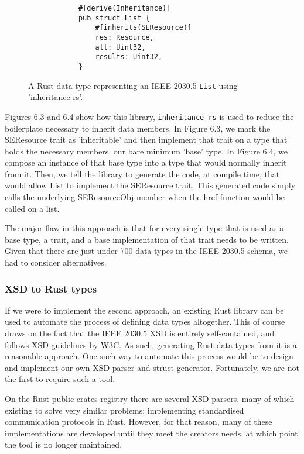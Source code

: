 \begin{figure}[H]
    \begin{center}
        \begin{lstlisting}
            #[derive(Inheritance)]
            pub struct List {
                #[inherits(SEResource)]
                res: Resource,
                all: Uint32,
                results: Uint32,
            }
        \end{lstlisting}
        \label{fig:listinher}
        \caption{A Rust data type representing an IEEE 2030.5 \texttt{List} using 'inheritance-rs'.}
    \end{center}
\end{figure}


Figures 6.3 and 6.4 show how this library, \texttt{inheritance-rs} \cite[]{inheritancers} is used to reduce the boilerplate necessary to inherit data members. 
In Figure 6.3, we mark the SEResource trait as 'inheritable' and then implement that trait on a type that holds the necessary members, our bare minimum 'base' type. 
In Figure 6.4, we compose an instance of that base type into a type that would normally inherit from it. Then, we tell the library to generate the code, at compile time, that would allow List to implement the SEResource trait.
This generated code simply calls the underlying SEResourceObj member when the href function would be called on a list.

The major flaw in this approach is that for every single type that is used as a base type, a trait, and a base implementation of that trait needs to be written.
Given that there are just under 700 data types in the IEEE 2030.5 schema, we had to consider alternatives.


\subsubsection{XSD to Rust types}

If we were to implement the second approach, an existing Rust library can be used to automate the process of defining data types altogether.
This of course draws on the fact that the IEEE 2030.5 XSD is entirely self-contained, and follows XSD guidelines by W3C. As such, generating Rust data types from it is a reasonable approach.
One such way to automate this process would be to design and implement our own XSD parser and struct generator. Fortunately, we are not the first to require such a tool.

On the Rust public crates registry there are several XSD parsers, many of which existing to solve very similar problems; implementing standardised communication protocols in Rust.
However, for that reason, many of these implementations are developed until they meet the creators needs, at which point the tool is no longer maintained.


